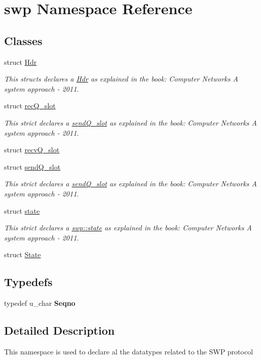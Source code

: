 \hypertarget{namespaceswp}{}\section{swp Namespace Reference}
\label{namespaceswp}
\subsection*{Classes}
\begin{DoxyCompactItemize}
\item 
struct \hyperlink{structswp_1_1Hdr}{Hdr}
\begin{DoxyCompactList}\small\item\em This structs declares a \hyperlink{structswp_1_1Hdr}{Hdr} as explained in the book\+: Computer Networks A system approach -\/ 2011. \end{DoxyCompactList}\item 
struct \hyperlink{structswp_1_1recQ__slot}{rec\+Q\+\_\+slot}
\begin{DoxyCompactList}\small\item\em This strict declares a \hyperlink{structswp_1_1sendQ__slot}{send\+Q\+\_\+slot} as explained in the book\+: Computer Networks A system approach -\/ 2011. \end{DoxyCompactList}\item 
struct \hyperlink{structswp_1_1recvQ__slot}{recv\+Q\+\_\+slot}
\item 
struct \hyperlink{structswp_1_1sendQ__slot}{send\+Q\+\_\+slot}
\begin{DoxyCompactList}\small\item\em This strict declares a \hyperlink{structswp_1_1sendQ__slot}{send\+Q\+\_\+slot} as explained in the book\+: Computer Networks A system approach -\/ 2011. \end{DoxyCompactList}\item 
struct \hyperlink{structswp_1_1state}{state}
\begin{DoxyCompactList}\small\item\em This strict declares a \hyperlink{structswp_1_1state}{swp\+::state} as explained in the book\+: Computer Networks A system approach -\/ 2011. \end{DoxyCompactList}\item 
struct \hyperlink{structswp_1_1State}{State}
\end{DoxyCompactItemize}
\subsection*{Typedefs}
\begin{DoxyCompactItemize}
\item 
typedef u\+\_\+char {\bfseries Seqno}\hypertarget{namespaceswp_a249c6e8c50c60f9947f596e2e997a76f}{}\label{namespaceswp_a249c6e8c50c60f9947f596e2e997a76f}

\end{DoxyCompactItemize}


\subsection{Detailed Description}
This namespace is used to declare al the datatypes related to the S\+WP protocol 